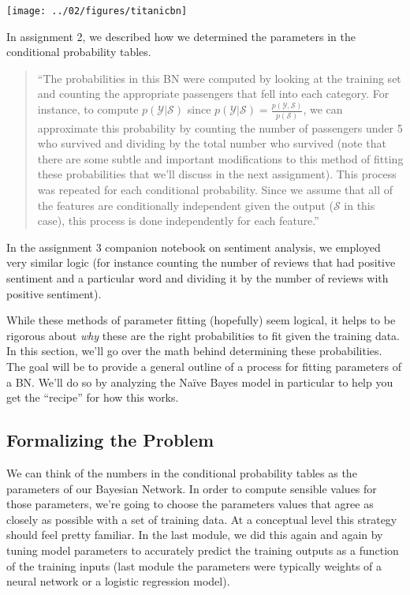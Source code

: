 \documentclass[assignment04_Solutions]{subfiles}
\begin{document}
\begin{center}
\texttt{[image: ../02/figures/titanicbn]}
\end{center}

In assignment 2, we described how we determined the parameters in the conditional probability tables.
\begin{quote}
``The probabilities in this BN were computed by looking at the training set and counting the appropriate passengers that fell into each category.  For instance, to compute $p(\mathcal{Y}|\mathcal{S})$ since $p(\mathcal{Y}|\mathcal{S}) = \frac{p(\mathcal{Y}, \mathcal{S})}{p(\mathcal{S})}$, we can approximate this probability by counting the number of passengers under 5 who survived and dividing by the total number who survived (note that there are some subtle and important modifications to this method of fitting these probabilities that we'll discuss in the next assignment).  This process was repeated for each conditional probability.  Since we assume that all of the features are conditionally independent given the output ($\mathcal{S}$ in this case), this process is done independently for each feature.''
\end{quote}

In the assignment 3 companion notebook on sentiment analysis, we employed very similar logic (for instance counting the number of reviews that had positive sentiment and a particular word and dividing it by the number of reviews with positive sentiment).

While these methods of parameter fitting (hopefully) seem logical, it helps to be rigorous about \emph{why} these are the right probabilities to fit given the training data.  In this section, we'll go over the math behind determining these probabilities.  The goal will be to provide a general outline of a process for fitting parameters of a BN.  We'll do so by analyzing the Na\"ive Bayes model in particular to help you get the ``recipe'' for how this works.

\subsection{Formalizing the Problem}
We can think of the numbers in the conditional probability tables as the parameters of our Bayesian Network.  In order to compute sensible values for those parameters, we're going to choose the parameters values that agree as closely as possible with a set of training data.  At a conceptual level this strategy should feel pretty familiar.  In the last module, we did this again and again by tuning model parameters to accurately predict the training outputs as a function of the training inputs (last module the parameters were typically weights of a neural network or a logistic regression model).
\end{document}
